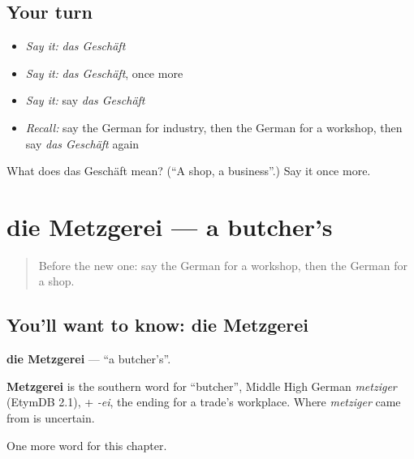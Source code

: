 \subsection*{Your turn}
\begin{itemize}
\raggedright
  \item \emph{Say it:} \emph{das Geschäft}
  \item \emph{Say it:} \emph{das Geschäft}, once more
  \item \emph{Say it:} say \emph{das Geschäft}
  \item \emph{Recall:} say the German for industry, then the German for a workshop, then say \emph{das Geschäft} again
\end{itemize}

\begin{tcolorbox}[breakable,colback=teal!4,colframe=teal!35!black,title={Before you move on}]
What does das Geschäft mean? (\textquotedblleft{}A shop, a business\textquotedblright{}.) Say it once more.
\end{tcolorbox}
\section[die Metzgerei]{die Metzgerei — a butcher's}

\label{lesson:GE-C210-metzgerei}



\begin{quote}
Before the new one: say the German for a workshop, then the German for a shop.
\end{quote}

\subsection*{You'll want to know: die Metzgerei}
\textbf{die Metzgerei} — \textquotedblleft{}a butcher's\textquotedblright{}.

\begin{cousinweb}
\textbf{Metzgerei} is the southern word for \textquotedblleft{}butcher\textquotedblright{}, Middle High German \emph{metziger} (EtymDB 2.1), + \emph{-ei}, the ending for a trade's workplace. Where \emph{metziger} came from is uncertain.
\end{cousinweb}

\begin{grammarlens}[title={What you've built}]
One more word for this chapter.
\end{grammarlens}

